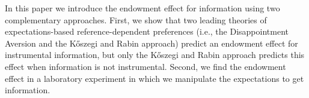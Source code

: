 

In this paper we introduce the endowment effect for information using two complementary approaches. First, we show that two leading theories of expectations-based reference-dependent preferences (i.e., the Disappointment Aversion and the Kőszegi and Rabin approach) predict an endowment effect for instrumental information, but only the Kőszegi and Rabin approach predicts this effect when information is not instrumental. Second, we find the endowment effect in a laboratory experiment in which we manipulate the expectations to get information.

